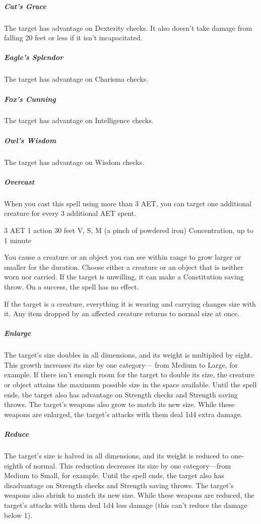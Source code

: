 \subparagraph*{Cat's Grace} The target has advantage on Dexterity checks. It also doesn't take damage from falling 20 feet or less if it isn't incapacitated.

\subparagraph*{Eagle's Splendor} The target has advantage on Charisma checks.

\subparagraph*{Fox's Cunning} The target has advantage on Intelligence checks.

\subparagraph*{Owl's Wisdom} The target has advantage on Wisdom checks.

\subparagraph*{Overcast} When you cast this spell using more than 3 AET, you can target one additional creature for every 3 additional AET spent.


{3 AET}
{1 action}
{30 feet}
{V, S, M (a pinch of powdered iron)}
{Concentration, up to 1 minute}

You cause a creature or an object you can see within range to grow larger or smaller for the duration. Choose either a creature or an object that is neither worn nor carried. If the target is unwilling, it can make a Constitution saving throw. On a success, the spell has no effect.

If the target is a creature, everything it is wearing and carrying changes size with it. Any item dropped by an affected creature returns to normal size at once.

\subparagraph*{Enlarge} The target's size doubles in all dimensions, and its weight is multiplied by eight. This growth increases its size by one category— from Medium to Large, for example. If there isn't enough room for the target to double its size, the creature or object attains the maximum possible size in the space available. Until the spell ends, the target also has advantage on Strength checks and Strength saving throws. The target's weapons also grow to match its new size. While these weapons are enlarged, the target's attacks with them deal 1d4 extra damage.

\subparagraph*{Reduce} The target's size is halved in all dimensions, and its weight is reduced to one-eighth of normal. This reduction decreases its size by one category—from Medium to Small, for example. Until the spell ends, the target also has disadvantage on Strength checks and Strength saving throws. The target's weapons also shrink to match its new size. While these weapons are reduced, the target's attacks with them deal 1d4 less damage (this can't reduce the damage below 1).


